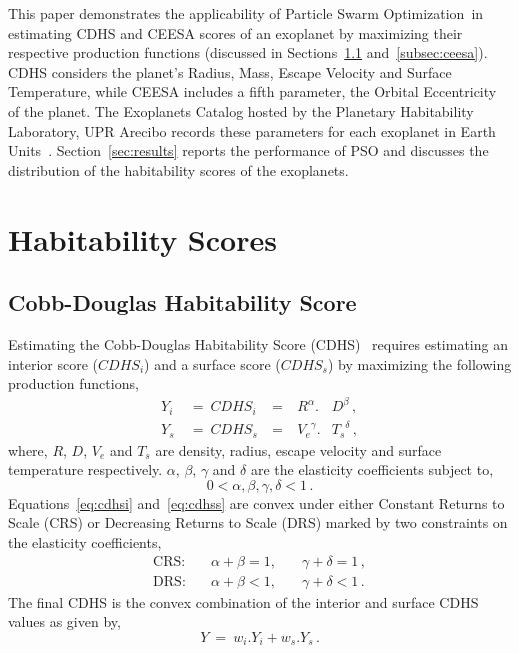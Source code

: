 \documentclass[10pt]{article}
\newcommand{\pso}{Particle Swarm Optimization}
\begin{document}
This paper demonstrates the applicability of \pso\ in estimating CDHS and CEESA scores of an exoplanet by maximizing
their respective production functions (discussed in Sections~\ref{subsec:cdhs} and~\ref{subsec:ceesa}). CDHS considers
the planet's Radius, Mass, Escape Velocity and Surface Temperature, while CEESA includes a fifth parameter, the Orbital
Eccentricity of the planet. The Exoplanets Catalog hosted by the Planetary Habitability Laboratory, UPR Arecibo records
these parameters for each exoplanet in Earth Units~\cite{PHL}. Section~\ref{sec:results} reports the performance of PSO
and discusses the distribution of the habitability scores of the exoplanets.


\section{Habitability Scores}\label{sec:habscore}

\subsection{Cobb-Douglas Habitability Score}\label{subsec:cdhs}
Estimating the Cobb-Douglas Habitability Score (CDHS)~\cite{Bora} requires estimating an interior score \linebreak
($\mathit{CDHS}_i$) and a surface score ($\mathit{CDHS}_s$) by maximizing the following production functions,
\begin{subequations}
  \begin{alignat}{4}
    Y_i\ &=\ {CDHS}_i\ &=&\ R^\alpha.&D^\beta\,,\label{eq:cdhsi}\\
    Y_s\ &=\ {CDHS}_s\ &=&\ {V_e}^\gamma.&{T_s}^\delta\,,\label{eq:cdhss}
  \end{alignat}
\end{subequations}
where, $R$, $D$, $V_e$ and $T_s$ are density, radius, escape velocity and surface temperature respectively. $\alpha$,
$\beta$, $\gamma$ and $\delta$ are the elasticity coefficients subject to,
\begin{equation}
  0 < \alpha,\beta,\gamma,\delta < 1\,.
\end{equation}
Equations~\ref{eq:cdhsi} and~\ref{eq:cdhss} are convex under either Constant Returns to Scale (CRS) or Decreasing
Returns to Scale (DRS) marked by two constraints on the elasticity coefficients,
\begin{subequations}
  \begin{alignat}{3}
    \text{CRS:} & \quad\alpha+\beta = 1,&\quad\gamma+\delta = 1\,,\\
    \text{DRS:} & \quad\alpha+\beta < 1,&\quad\gamma+\delta < 1\,.
  \end{alignat}
\end{subequations}
The final CDHS is the convex combination of the interior and surface CDHS values as given by,
\begin{equation}
  Y\ =\ w_i.Y_i + w_s.Y_s\,.
\end{equation}
\end{document}
